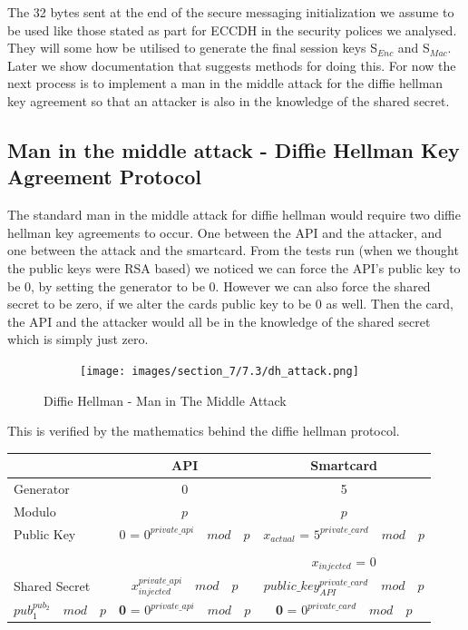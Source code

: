 \documentclass[bsc,frontabs,twoside,singlespacing,parskip,deptreport]{infthesis}     %
\begin{document}
The 32 bytes sent at the end of the secure messaging initialization we assume to be used like those stated as part for ECCDH in the security polices we analysed. They will some how be utilised to generate the final session keys S$_{Enc}$ and S$_{Mac}$. Later we show documentation that suggests methods for doing this. For now the next process is to implement a man in the middle attack for the diffie hellman key agreement so that an attacker is also in the knowledge of the shared secret.

\subsection{Man in the middle attack - Diffie Hellman Key Agreement Protocol}
The standard man in the middle attack for diffie hellman would require two diffie hellman key agreements to occur. One between the API and the attacker, and one between the attack and the smartcard. From the tests run (when we thought the public keys were RSA based) we noticed we can force the API's public key to be 0, by setting the generator to be 0. However we can also force the shared secret to be zero, if we alter the cards public key to be 0 as well. Then the card, the API and the attacker would all be in the knowledge of the shared secret which is simply just zero. 

\begin{figure}[H]
\centering
\begin{subfigure}{1\textwidth}
  \texttt{[image: images/section\_7/7.3/dh\_attack.png]}
\end{subfigure}
\caption{Diffie Hellman - Man in The Middle Attack}
\end{figure}

This is verified by the mathematics behind the diffie hellman protocol.

\begin{table}[H]
\begin{tabular}{|l|c|c|}
\hline
 & API & Smartcard\\
\hline
Generator & 0 & 5\\
\hline
Modulo & $p$ & $p$ \\
\hline
Public Key & 0 = $0^{private\_api} \quad mod \quad p$  & $x_{actual}$ = $5^{private\_card} \quad mod \quad p$\\
 & & \\
 & & $x_{injected}$ = 0\\
\hline
Shared Secret & $x_{injected}^{private\_api} \quad mod \quad p$ & $ public\_key_{API}^{private\_card} \quad mod \quad p$ \\
$pub_1^{pub_2} \quad mod \quad p$ & \textbf{0} = $0^{private\_api} \quad mod \quad p$ &\textbf{0} = $0^{private\_card} \quad mod \quad p$\\
\hline
\end{tabular}
\end{table}
\end{document}

